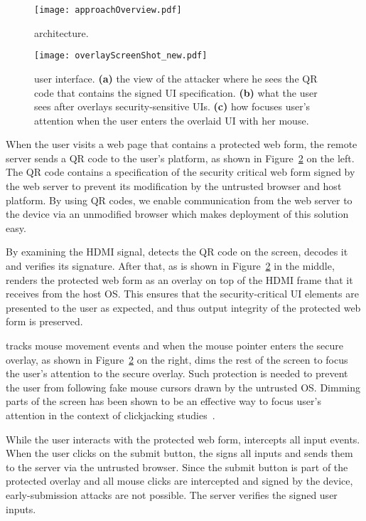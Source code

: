 \begin{figure}[t]
	\centering
	\texttt{[image: approachOverview.pdf]}
	\caption{\protection architecture.}
	\label{fig:architecture}
\end{figure}

\begin{figure}[t]
	\centering
	\texttt{[image: overlayScreenShot\_new.pdf]}
	\caption{\protection user interface. \textbf{(a)} the view of the attacker where he sees the QR code that contains the signed UI specification. \textbf{(b)} what the user sees after \hub overlays security-sensitive UIs. \textbf{(c)} how \protection focuses user's attention when the user enters the overlaid UI with her mouse.}
	\label{fig:screenshot}
\end{figure}

When the user visits a web page that contains a protected web form, the remote server sends a QR code to the user's platform, as shown in Figure~\ref{fig:screenshot} on the left. The QR code contains a specification of the security critical web form signed by the web server to prevent its modification by the untrusted browser and host platform. By using QR codes, we enable communication from the web server to the \hub device via an unmodified browser which makes deployment of this solution easy.

By examining the HDMI signal, \hub detects the QR code on the screen, decodes it and verifies its signature. After that, as is shown in Figure~\ref{fig:screenshot} in the middle, \hub renders the protected web form as an overlay on top of the HDMI frame that it receives from the host OS. This ensures that the security-critical UI elements are presented to the user as expected, and thus output integrity of the protected web form is preserved.

\hub tracks mouse movement events and when the mouse pointer enters the secure overlay, as shown in Figure~\ref{fig:screenshot} on the right, \hub dims the rest of the screen to focus the user's attention to the secure overlay. Such protection is needed to prevent the user from following fake mouse cursors drawn by the untrusted OS. Dimming parts of the screen has been shown to be an effective way to focus user's attention in the context of clickjacking studies~\cite{huang2012clickjacking}.

While the user interacts with the protected web form, \hub intercepts all input events. When the user clicks on the submit button, the \hub signs all inputs and sends them to the server via the untrusted browser. Since the submit button is part of the protected overlay and all mouse clicks are intercepted and signed by the \hub device, early-submission attacks are not possible. The server verifies the signed user inputs. 

